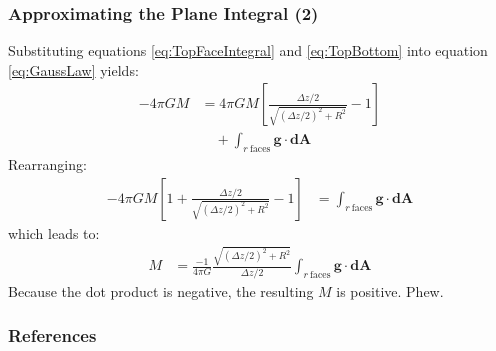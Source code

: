 \documentclass[aspectratio=43,serif,9pt]{beamer}
\newcommand{\vect}[1]{\boldsymbol{#1}}
\begin{document}


\begin{frame}
  \frametitle{Approximating the Plane Integral (2)}
  Substituting equations \eqref{eq:TopFaceIntegral} and  \eqref{eq:TopBottom} into equation \eqref{eq:GaussLaw} yields:
  \begin{align*}
    -4 \pi G M &= 4\pi G M \left[ \frac{\Delta z/2}{\sqrt{(\Delta z/2)^2 + R^2}} - 1\right]\\
               &\quad + \int_{r~\mathrm{faces}} \vect{g} \cdot  \vect{dA}
  \end{align*}
  Rearranging:
  \begin{align*}
    -4 \pi G M \left[ 1 + \frac{\Delta z/2}{\sqrt{(\Delta z/2)^2 + R^2}} - 1\right]
    & = \int_{r~\mathrm{faces}} \vect{g} \cdot  \vect{dA}
  \end{align*}
  which leads to:
  \begin{align}
    M  & = \frac{-1}{4 \pi G} \frac{\sqrt{(\Delta z/2)^2 + R^2}}{\Delta z/2} \int_{r~\mathrm{faces}} \vect{g} \cdot  \vect{dA} \label{eq:FinalM}
  \end{align}
Because the dot product is negative, the resulting $M$ is positive. Phew.

\end{frame}

\begin{frame}[t,allowframebreaks]
  \frametitle{References}
  \small
  \printbibliography
\end{frame}

 
\end{document}
